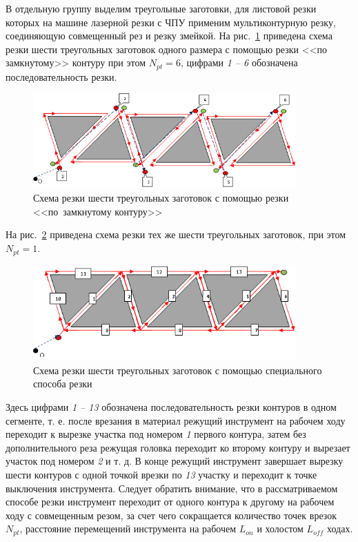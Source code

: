 \documentclass[11pt,twoside,openany]{report}
\begin{document}
В отдельную группу выделим треугольные заготовки,
для листовой резки которых на машине лазерной резки с ЧПУ
применим мультиконтурную резку,
соединяющую совмещенный рез и резку змейкой.
На рис.~\ref{6-6}
приведена схема резки шести треугольных заготовок
одного размера с помощью резки <<по замкнутому>> контуру при этом
$N_{pt}=6$,
цифрами {\it 1 -- 6}
обозначена последовательность резки.

\begin{figure}[h]
  \begin{center}
  \includegraphics[width=0.9\textwidth]{6-6.png}
  \caption{
    Схема резки шести треугольных заготовок
    с помощью резки
    <<по~замкнутому контуру>>
    }
  \label{6-6}
  \end{center}
\end{figure}

На рис.~\ref{6-1} приведена схема резки тех же шести
треугольных заготовок, при этом
$N_{pt}=1$.

\begin{figure}[h]
  \begin{center}
  \includegraphics[width=0.9\textwidth]{6-1.png}
  \caption{Схема резки шести треугольных заготовок с помощью специального способа резки}
  \label{6-1}
  \end{center}
\end{figure}

Здесь цифрами {\it 1 -- 13} обозначена последовательность
резки контуров в одном сегменте,
т. е. после врезания в материал режущий инструмент
на рабочем ходу переходит к вырезке участка под номером {\it 1}
первого контура,
затем без дополнительного реза режущая головка
переходит ко второму контуру и вырезает участок под номером
{\it 2} и т. д.
В конце режущий инструмент завершает вырезку шести контуров
с одной точкой врезки по {\it 13} участку и переходит к
точке выключения инструмента.
Следует обратить внимание, что в рассматриваемом способе
резки инструмент переходит от одного контура к другому
на рабочем ходу с совмещенным резом,
за счет чего сокращается количество точек врезок $N_{pt}$,
расстояние перемещений инструмента на рабочем $L_{on}$
и холостом  $L_{off}$ ходах.
\end{document}
